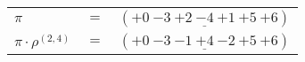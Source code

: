 \begin{example}\label{example:DCRMAYUA}
  \hfill \break
  \begin{tabular}{lll}
    $\pi$ & $=$ & $({+0}~{-3}~\underline{{+2}~{-4}~{+1}}~{+5}~{+6})$ \\
    $\pi \cdot \rho^{(2,4)}$ & $=$ & $({+0}~{-3}~\underline{{-1}~{+4}~{-2}}~{+5}~{+6})$ \\
  \end{tabular}
\end{example}